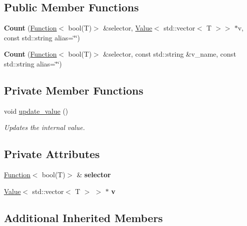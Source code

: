 \subsection*{Public Member Functions}
\begin{DoxyCompactItemize}
\item 
\hypertarget{classfv_1_1Count_a8d737015331b4bdff6614118c957bfb6}{}\label{classfv_1_1Count_a8d737015331b4bdff6614118c957bfb6} 
{\bfseries Count} (\hyperlink{classfv_1_1Function}{Function}$<$ bool(T)$>$ \&selector, \hyperlink{classfv_1_1Value}{Value}$<$ std\+::vector$<$ T $>$$>$ $\ast$v, const std\+::string alias=\char`\"{}\char`\"{})
\item 
\hypertarget{classfv_1_1Count_a1ea910638294d8a70c6892ac93b23654}{}\label{classfv_1_1Count_a1ea910638294d8a70c6892ac93b23654} 
{\bfseries Count} (\hyperlink{classfv_1_1Function}{Function}$<$ bool(T)$>$ \&selector, const std\+::string \&v\+\_\+name, const std\+::string alias=\char`\"{}\char`\"{})
\end{DoxyCompactItemize}
\subsection*{Private Member Functions}
\begin{DoxyCompactItemize}
\item 
void \hyperlink{classfv_1_1Count_afff1c16a8747a82db1cc1c8248c56a08}{update\+\_\+value} ()
\begin{DoxyCompactList}\small\item\em Updates the internal value. \end{DoxyCompactList}\end{DoxyCompactItemize}
\subsection*{Private Attributes}
\begin{DoxyCompactItemize}
\item 
\hypertarget{classfv_1_1Count_a1dbfccc8020b2c41adcedc5e449ff3be}{}\label{classfv_1_1Count_a1dbfccc8020b2c41adcedc5e449ff3be} 
\hyperlink{classfv_1_1Function}{Function}$<$ bool(T)$>$ \& {\bfseries selector}
\item 
\hypertarget{classfv_1_1Count_a3bb2f22dc995dc833f513805128e3a44}{}\label{classfv_1_1Count_a3bb2f22dc995dc833f513805128e3a44} 
\hyperlink{classfv_1_1Value}{Value}$<$ std\+::vector$<$ T $>$ $>$ $\ast$ {\bfseries v}
\end{DoxyCompactItemize}
\subsection*{Additional Inherited Members}


